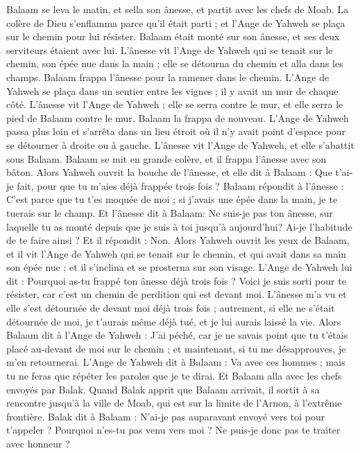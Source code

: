 \begin{multicols}{2}
Balaam se leva le matin, et sella son ânesse, et partit avec les chefs de Moab.
La colère de Dieu s'enflamma parce qu'il était parti ; et l'Ange de Yahweh se plaça sur le chemin pour lui résister. Balaam était monté sur son ânesse, et ses deux serviteurs étaient avec lui.
L'ânesse vit l'Ange de Yahweh qui se tenait sur le chemin, son épée nue dans la main ; elle se détourna du chemin et alla dans les champs. Balaam frappa l'ânesse pour la ramener dans le chemin.
L’Ange de Yahweh se plaça dans un sentier entre les vignes ; il y avait un mur de chaque côté.
L'ânesse vit l'Ange de Yahweh ; elle se serra contre le mur, et elle serra le pied de Balaam contre le mur. Balaam la frappa de nouveau.
L'Ange de Yahweh passa plus loin et s'arrêta dans un lieu étroit où il n'y avait point d’espace pour se détourner à droite ou à gauche.
L'ânesse vit l'Ange de Yahweh, et elle s’abattit sous Balaam. Balaam se mit en grande colère, et il frappa l'ânesse avec son bâton.
Alors Yahweh ouvrit la bouche de l'ânesse, et elle dit à Balaam : Que t'ai-je fait, pour que tu m'aies déjà frappée trois fois ?
Balaam répondit à l'ânesse : C’est parce que tu t'es moquée de moi ; si j’avais une épée dans la main, je te tuerais sur le champ.
Et l'ânesse dit à Balaam: Ne suis-je pas ton ânesse, sur laquelle tu as monté depuis que je suis à toi jusqu'à aujourd'hui? Ai-je l’habitude de te faire ainsi ? Et il répondit : Non.
Alors Yahweh ouvrit les yeux de Balaam, et il vit l'Ange de Yahweh qui se tenait sur le chemin, et qui avait dans sa main son épée nue ; et il s'inclina et se prosterna sur son visage.
L'Ange de Yahweh lui dit : Pourquoi as-tu frappé ton ânesse déjà trois fois ? Voici je suis sorti pour te résister, car c’est un chemin de perdition qui est devant moi.
L'ânesse m'a vu et elle s'est détournée de devant moi déjà trois fois ; autrement, si elle ne s'était détournée de moi, je t'aurais même déjà tué, et je lui aurais laissé la vie.
Alors Balaam dit à l'Ange de Yahweh : J'ai péché, car je ne savais point que tu t’étais placé au-devant de moi sur le chemin ; et maintenant, si tu me désapprouves, je m'en retournerai.
L'Ange de Yahweh dit à Balaam : Va avec ces hommes ; mais tu ne feras que répéter les paroles que je te dirai. Et Balaam alla avec les chefs envoyés par Balak.
Quand Balak apprit que Balaam arrivait, il sortit à sa rencontre jusqu’à la ville de Moab, qui est sur la limite de l'Arnon, à l’extrême frontière.
Balak dit à Balaam : N'ai-je pas auparavant envoyé vers toi pour t'appeler ? Pourquoi n'es-tu pas venu vers moi ? Ne puis-je donc pas te traiter avec honneur ?

\end{multicols}
